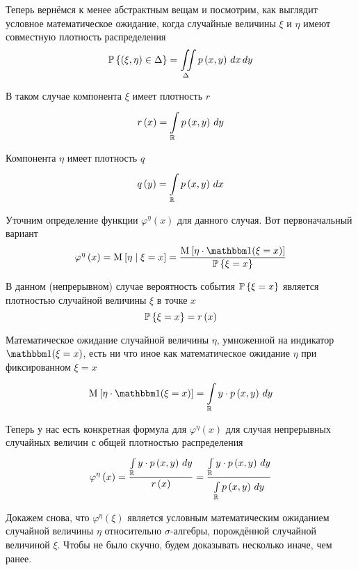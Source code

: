 Теперь вернёмся к менее абстрактным вещам и посмотрим,
как выглядит условное математическое ожидание,
когда случайные величины $\xi$ и $\eta$ имеют совместную плотность распределения
$$\Probability{\left( \xi, \eta \right) \in \Delta}
    = \iint\limits_\Delta\pdf{x,y} \, dx \, dy$$

В таком случае компонента $\xi$ имеет плотность $r$
$$r\left( x \right) = \integral{\mathbb{R}}{}{y}{\pdf{x,y}}$$

Компонента $\eta$ имеет плотность $q$
$$q\left( y \right) = \integral{\mathbb{R}}{}{x}{\pdf{x,y}}$$

Уточним определение функции $\varphi^{\eta}\left( x \right)$
для данного случая. Вот первоначальный вариант
$$\varphi^{\eta}\left( x \right)
    = \Mean{ \eta \mcond \xi=x }
    = \frac{\Mean{ \eta \cdot \indicator{\xi=x} }}
        {\Probability{\xi=x}}$$

В данном (непрерывном) случае вероятность события $\Probability{\xi=x}$ является
плотностью случайной величины $\xi$ в точке $x$
$$\Probability{\xi=x} = r\left( x \right)$$

Математическое ожидание случайной величины $\eta$,
умноженной на индикатор $\indicator{\xi=x}$,
есть ни что иное как математическое ожидание $\eta$ при фиксированном $\xi=x$
$$\Mean{ \eta \cdot \indicator{\xi=x} }
    = \integral{\mathbb{R}}{}{y}{y \cdot \pdf{x,y}}$$

Теперь у нас есть конкретная формула для $\varphi^{\eta}\left( x \right)$
для случая непрерывных случайных величин с общей плотностью распределения
\begin{equation}\label{phiIntegral}
    \varphi^{\eta}\left( x \right)
        = \frac{\integral{\mathbb{R}}{}{y}{y \cdot \pdf{x,y}}}
            {r\left( x \right)}
        = \frac{\integral{\mathbb{R}}{}{y}{y \cdot \pdf{x,y}}}
            {\integral{\mathbb{R}}{}{y}{\pdf{x,y}}}
\end{equation}

Докажем снова, что $\varphi^\eta\left( \xi \right)$ является
условным математическим ожиданием случайной величины $\eta$
относительно $\sigma$-алгебры, порождённой случайной величиной $\xi$.
Чтобы не было скучно, будем доказывать несколько иначе, чем ранее.

